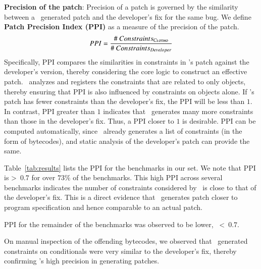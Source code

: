 \begin{mylist}
\item \textbf{Precision of the patch}: Precision of a patch is governed by the
similarity between a \tool\ generated patch and the developer's fix for the same
bug. We define \textbf{Patch Precision Index (PPI)} as a measure of the
precision of the patch. $$PPI =
\frac{\#~Constraints_{\textsc{Clotho}}}{\#~Constraints_{Developer}}$$
% 
Specifically, PPI compares the similarities in constraints in \tool's patch
against the developer's version, thereby considering the core logic to construct
an effective patch. \tool\ analyzes and registers the constraints that are
related to only  objects, thereby ensuring that PPI is also
influenced by constraints on  objects alone. If \tool's patch has
fewer constraints than the developer's fix, the PPI will be less than $1$. In
contrast, PPI greater than $1$ indicates that \tool\ generates many more
constraints than those in the developer's fix. Thus, a PPI closer to $1$ is
desirable. PPI can be computed automatically, since \tool\ already generates a
list of constraints (in the form of bytecodes), and static analysis of the
developer's patch can provide the same.

Table~\ref{tab:results} lists the PPI for the benchmarks in our set. We note
that PPI is \textgreater\ $0.7$ for over $73\%$ of the benchmarks. This high PPI
across several benchmarks indicates the number of  constraints
considered by \tool\ is close to that of the developer's fix. This is a direct
evidence that \tool\ generates patch closer to program specification and hence
comparable to an actual patch. PPI for the remainder
of the benchmarks was observed to be lower, \ie\ \textless\ $0.7$. On manual inspection of the offending bytecodes, we
observed that \tool\ generated constraints on  conditionals were
very similar to the developer's fix, thereby confirming \tool's high precision
in generating patches.


\end{mylist}
